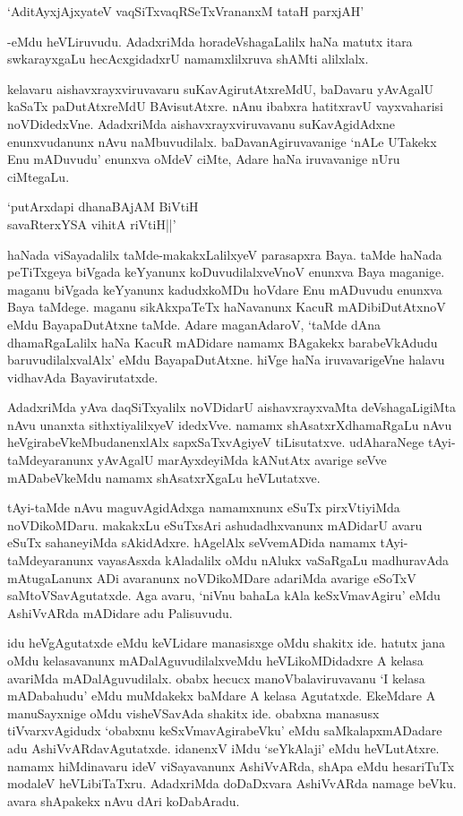 \begin{shloka}
`AditAyxjAjxyateV vaqSiTxvaqRSeTxVrananxM tataH parxjAH'
\end{shloka}

-eMdu heVLiruvudu. AdadxriMda horadeVshagaLalilx haNa matutx itara swkarayxgaLu hecAcxgidadxrU namamxlilxruva shAMti alilxlalx.

kelavaru aishavxrayxviruvavaru suKavAgirutAtxreMdU, baDavaru yAvAgalU kaSaTx paDutAtxreMdU BAvisutAtxre. nAnu ibabxra hatitxravU vayxvaharisi noVDidedxVne. AdadxriMda aishavxrayxviruvavanu suKavAgidAdxne enunxvudanunx nAvu naMbuvudilalx. baDavanAgiruvavanige `nALe UTakekx Enu mADuvudu' enunxva oMdeV ciMte, Adare haNa iruvavanige nUru ciMtegaLu.

\begin{shloka}
`putArxdapi dhanaBAjAM BiVtiH\\
savaRterxYSA vihitA riVtiH||'
\end{shloka}

haNada viSayadalilx taMde-makakxLalilxyeV parasapxra Baya. taMde haNada peTiTxgeya biVgada keYyanunx koDuvudilalxveVnoV enunxva Baya maganige. maganu biVgada keYyanunx kadudxkoMDu hoVdare Enu mADuvudu enunxva Baya taMdege. maganu sikAkxpaTeTx haNavanunx KacuR mADibiDutAtxnoV eMdu BayapaDutAtxne taMde. Adare maganAdaroV, `taMde dAna dhamaRgaLalilx haNa KacuR mADidare namamx BAgakekx barabeVkAdudu baruvudilalxvalAlx' eMdu BayapaDutAtxne. hiVge haNa iruvavarigeVne halavu vidhavAda Bayavirutatxde.

AdadxriMda yAva daqSiTxyalilx noVDidarU aishavxrayxvaMta deVshagaLigiMta nAvu unanxta sithxtiyalilxyeV idedxVve. namamx shAsatxrXdhamaRgaLu nAvu heVgirabeVkeMbudanenxlAlx sapxSaTxvAgiyeV tiLisutatxve. udAharaNege tAyi-taMdeyaranunx yAvAgalU marAyxdeyiMda kANutAtx avarige seVve mADabeVkeMdu namamx shAsatxrXgaLu heVLutatxve.

tAyi-taMde nAvu maguvAgidAdxga namamxnunx eSuTx pirxVtiyiMda noVDikoMDaru. makakxLu eSuTxsAri ashudadhxvanunx mADidarU avaru eSuTx sahaneyiMda sAkidAdxre. hAgelAlx seVvemADida namamx tAyi-taMdeyaranunx vayasAsxda kAladalilx oMdu nAlukx vaSaRgaLu madhuravAda mAtugaLanunx ADi avaranunx noVDikoMDare adariMda avarige eSoTxV saMtoVSavAgutatxde. Aga avaru, `niVnu bahaLa kAla keSxVmavAgiru' eMdu AshiVvARda mADidare adu Palisuvudu.

idu heVgAgutatxde eMdu keVLidare manasisxge oMdu shakitx ide. hatutx jana oMdu kelasavanunx mADalAguvudilalxveMdu heVLikoMDidadxre A kelasa avariMda mADalAguvudilalx. obabx hecucx manoVbalaviruvavanu `I kelasa mADabahudu' eMdu muMdakekx baMdare A kelasa Agutatxde. EkeMdare A manuSayxnige oMdu visheVSavAda shakitx ide. obabxna manasusx tiVvarxvAgidudx `obabxnu keSxVmavAgirabeVku' eMdu saMkalapxmADadare adu AshiVvARdavAgutatxde. idanenxV iMdu `seYkAlaji' eMdu heVLutAtxre. namamx hiMdinavaru ideV viSayavanunx AshiVvARda, shApa eMdu hesariTuTx modaleV heVLibiTaTxru. AdadxriMda doDaDxvara AshiVvARda namage beVku. avara shApakekx nAvu dAri koDabAradu.


